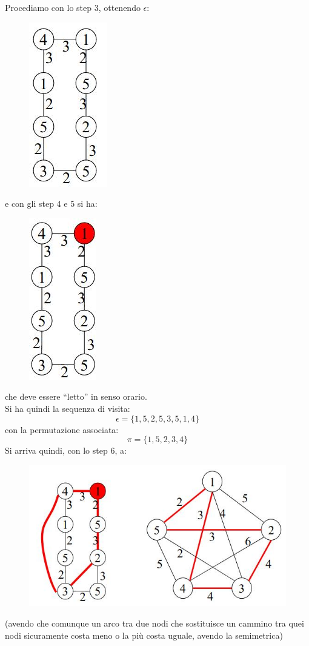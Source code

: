\documentclass[a4paper,12pt, oneside]{book}
\begin{document}
\begin{esempio}
\begin{figure}[H]
  \end{figure}
  Procediamo con lo step 3, ottenendo $\epsilon$:
  \begin{figure}[H]
    \centering
    \includegraphics[scale = 0.4]{img/ch4.jpg}
  \end{figure}
  e con gli step 4 e 5 si ha:
  \begin{figure}[H]
    \centering
    \includegraphics[scale = 0.4]{img/ch5.jpg}
  \end{figure}
  che deve essere ``letto'' in senso orario.\\
  Si ha quindi la sequenza di visita:
  \[\epsilon=\{1,5,2,5,3,5,1,4\}\]
  con la permutazione associata:
  \[\pi=\{1,5,2,3,4\}\]
  Si arriva quindi, con lo step 6, a:
  \begin{figure}[H]
    \centering
    \includegraphics[scale = 0.4]{img/ch6.jpg}
  \end{figure}
  (avendo che comunque un arco tra due nodi che sostituisce un cammino tra quei
  nodi sicuramente costa meno o la più costa uguale, avendo la semimetrica)
\end{esempio}
\end{document}
